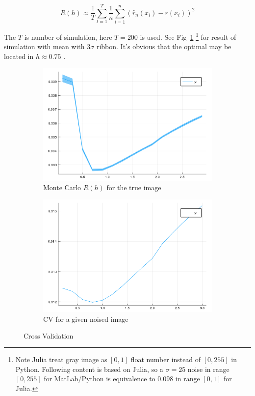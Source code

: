 \documentclass{article}
\begin{document}
$$
R(h) \approx \frac{1}{T} \sum_{t=1}^T \frac{1}{n}\sum_{i=1}^n(\hat{r}_n(x_i)-r(x_i))^2
$$

The $T$ is number of simulation, here $T=200$ is used. See Fig~\ref{fig:crossvalidation_mc}
\footnote{Note Julia treat gray image as $[0,1]$ float number instead of $[0,255]$ in Python. Following content is based on Julia,
so a $\sigma=25$ noise in range $[0,255]$ for MatLab/Python is equivalence to $0.098$ in range $[0,1]$ for Julia.}
 for result of simulation with mean with $3\sigma$ ribbon. 
It's obvious that the optimal may be located in $h \approx 0.75$ .

\begin{figure}[htb]
  \centering
  \begin{subfigure}[b]{0.49\linewidth}
    \includegraphics[width=\linewidth]{images/crossvalidation1.png}
    \caption{Monte Carlo $R(h)$ for the true image}
    \label{fig:crossvalidation_mc}
  \end{subfigure}
  \begin{subfigure}[b]{0.49\linewidth}
    \includegraphics[width=\linewidth]{images/crossvalidation2.png}
    \caption{CV for a given noised image}
    \label{fig:crossvalidation_cv}
  \end{subfigure}
  \caption{Cross Validation}
  \label{fig:crossvalidation}
\end{figure}
\end{document}
